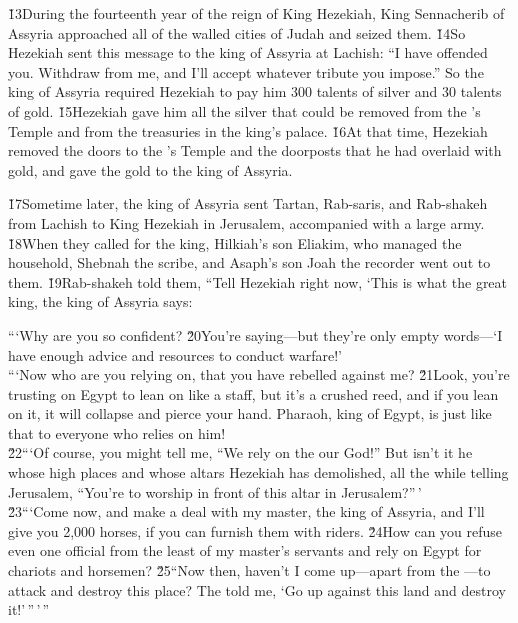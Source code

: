 \v{13}During the fourteenth year of the reign of King Hezekiah, King Sennacherib of Assyria approached all of the walled cities of Judah and seized them. \v{14}So Hezekiah sent this message to the king of Assyria at Lachish: ``I have offended you. Withdraw from me, and I'll accept whatever tribute you impose.'' So the king of Assyria required Hezekiah to pay him 300 talents of silver and 30 talents of gold. \v{15}Hezekiah gave him all the silver that could be removed from the 's Temple and from the treasuries in the king's palace. \v{16}At that time, Hezekiah removed the doors to the 's Temple and the doorposts that he had overlaid with gold, and gave the gold to the king of Assyria.

\v{17}Sometime later, the king of Assyria sent Tartan, Rab-saris, and Rab-shakeh from Lachish to King Hezekiah in Jerusalem, accompanied with a large army. \v{18}When they called for the king, Hilkiah's son Eliakim, who managed the household, Shebnah the scribe, and Asaph's son Joah the recorder went out to them. \v{19}Rab-shakeh told them, ``Tell Hezekiah right now, `This is what the great king, the king of Assyria says:

\begin{poetry}
\poeml ```Why are you so confident? \v{20}You're saying---but they're only empty words---`I have enough advice and resources to conduct warfare!' \\
\poeml ```Now who are you relying on, that you have rebelled against me? \v{21}Look, you're trusting on Egypt to lean on like a staff, but it's a crushed reed, and if you lean on it, it will collapse and pierce your hand. Pharaoh, king of Egypt, is just like that to everyone who relies on him! \\
\poeml \v{22}```Of course, you might tell me, ``We rely on the  our God!'' But isn't it he whose high places and whose altars Hezekiah has demolished, all the while telling Jerusalem, ``You're to worship in front of this altar in Jerusalem?''\,' \\
\poeml \v{23}```Come now, and make a deal with my master, the king of Assyria, and I'll give you 2,000 horses, if you can furnish them with riders. \v{24}How can you refuse even one official from the least of my master's servants and rely on Egypt for chariots and horsemen? \v{25}``Now then, haven't I come up---apart from the ---to attack and destroy this place? The  told me, `Go up against this land and destroy it!'\,''\,'\,''
\end{poetry}

